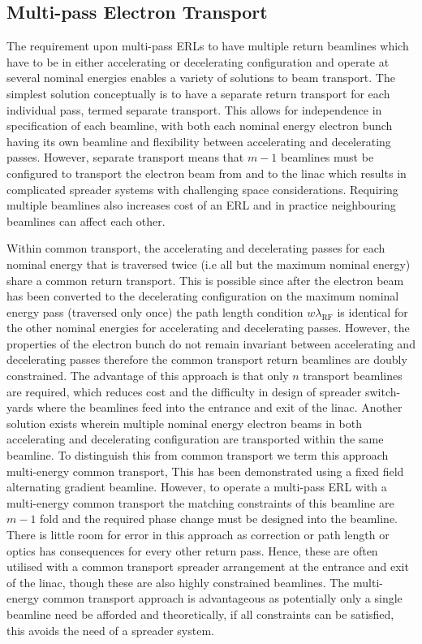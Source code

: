 \documentclass[../main.tex]{subfiles}
\begin{document}
\subsection{Multi-pass Electron Transport}

The requirement upon multi-pass ERLs to have multiple return beamlines which have to be in either accelerating or decelerating configuration and operate at several nominal energies enables a variety of solutions to beam transport. The simplest solution conceptually is to have a separate return transport for each individual pass, termed separate transport. This allows for independence in specification of each beamline, with both each nominal energy electron bunch having its own beamline and flexibility between accelerating and decelerating passes. However, separate transport means that $m-1$ beamlines must be configured to transport the electron beam from and to the linac which results in complicated spreader systems with challenging space considerations. Requiring multiple beamlines also increases cost of an ERL and in practice neighbouring beamlines can affect each other.

Within common transport, the accelerating and decelerating passes for each nominal energy that is traversed twice (i.e all but the maximum nominal energy) share a common return transport. This is possible since after the electron beam has been converted to the decelerating configuration on the maximum nominal energy pass (traversed only once) the path length condition $w\lambda_{\mathrm{RF}}$ is identical for the other nominal energies for accelerating and decelerating passes. However, the properties of the electron bunch do not remain invariant between accelerating and decelerating passes therefore the common transport return beamlines are doubly constrained. The advantage of this approach is that only $n$ transport beamlines are required, which reduces cost and the difficulty in design of spreader switch-yards where the beamlines feed into the entrance and exit of the linac.   
Another solution exists wherein multiple nominal energy electron beams in both accelerating and decelerating configuration are transported within the same beamline. To distinguish this from common transport we term this approach multi-energy common transport, This has been demonstrated \cite{bartnik2020cbeta} using a fixed field alternating gradient beamline. However, to operate a multi-pass ERL with a multi-energy common transport the matching constraints of this beamline are $m-1$ fold and the required phase change must be designed into the beamline. There is little room for error in this approach as correction or path length or optics has consequences for every other return pass. Hence, these are often utilised with a common transport spreader arrangement at the entrance and exit of the linac, though these are also highly constrained beamlines. The multi-energy common transport approach is advantageous as potentially only a single beamline need be afforded and theoretically, if all constraints can be satisfied, this avoids the need of a spreader system.  
\end{document}

